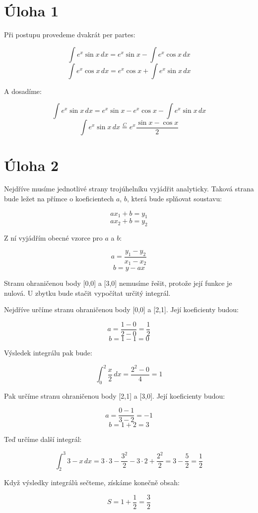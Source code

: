\documentclass{fkssolpub}
\author{Ondřej Sedláček}
\newcommand{\ceq}{\stackrel{C}{=}}
\begin{document}
 

\section{Úloha 1}

Při postupu provedeme dvakrát per partes:

\[
  \int e^x \sin x \, dx = e^x \sin x - \int e^x \cos x \, dx
\]
\[
  \int e^x \cos x \, dx = e^x \cos x + \int e^x \sin x \, dx
\]

A dosadíme:

\[
  \int e^x \sin x \, dx = e^x \sin x - e^x \cos x - \int e^x \sin x \, dx
\]
\[
  \int e^x \sin x \, dx \ceq e^x \frac{\sin x - \cos x}{2}
\]

\section{Úloha 2}

Nejdříve musíme jednotlivé strany trojúhelníku vyjádřit analyticky. Taková
strana bude ležet na přímce o koeficientech $a$, $b$, která bude splňovat
soustavu:

\[
  ax_1 + b = y_1
\]
\[
  ax_2 + b = y_2
\]

Z ní vyjádřím obecné vzorce pro $a$ a $b$:

\[
  a = \frac{y_1 - y_2}{x_1 - x_2}
\]
\[
  b = y - ax
\]

Stranu ohraničenou body [0,0] a [3,0] nemusíme řešit, protože její funkce je
nulová. U zbytku bude stačit vypočítat určitý integrál.

Nejdříve určíme stranu ohraničenou body [0,0] a [2,1]. Její koeficienty budou:

\[
  a = \frac{1 - 0}{2 - 0} = \frac{1}{2}
\]
\[
  b = 1 - 1 = 0
\]

Výsledek integrálu pak bude:

\[
  \int_0^2 \frac{x}{2} \, dx = \frac{2^2 - 0}{4} = 1
\]

Pak určíme stranu ohraničenou body [2,1] a [3,0]. Její koeficienty budou:

\[
  a = \frac{0 - 1}{3 - 2} = -1
\]
\[
  b = 1 + 2 = 3
\]

Teď určíme další integrál:

\[
  \int_2^3 3 - x \, dx = 3 \cdot 3 - \frac{3^2}{2} - 3 \cdot 2 + \frac{2^2}{2}
    = 3 - \frac{5}{2} = \frac{1}{2}
\]

Když výsledky integrálů sečteme, získáme konečně obsah:

\[
  S = 1 + \frac{1}{2} = \frac{3}{2}
\]
\end{document}

